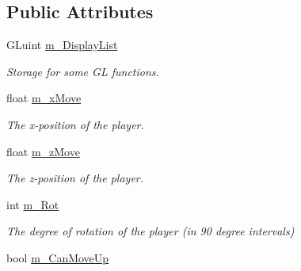 \subsection*{Public Attributes}
\begin{DoxyCompactItemize}
\item 
\hypertarget{classBomberman_afb6735947d5308bfb79026736856cf0a}{G\-Luint \hyperlink{classBomberman_afb6735947d5308bfb79026736856cf0a}{m\-\_\-\-Display\-List}}\label{classBomberman_afb6735947d5308bfb79026736856cf0a}

\begin{DoxyCompactList}\small\item\em Storage for some G\-L functions. \end{DoxyCompactList}\item 
\hypertarget{classBomberman_a59156afbe8c5411468b3c1bf411df69e}{float \hyperlink{classBomberman_a59156afbe8c5411468b3c1bf411df69e}{m\-\_\-x\-Move}}\label{classBomberman_a59156afbe8c5411468b3c1bf411df69e}

\begin{DoxyCompactList}\small\item\em The x-\/position of the player. \end{DoxyCompactList}\item 
\hypertarget{classBomberman_a7e4db42f41e0f48f9e4161b9145d7bab}{float \hyperlink{classBomberman_a7e4db42f41e0f48f9e4161b9145d7bab}{m\-\_\-z\-Move}}\label{classBomberman_a7e4db42f41e0f48f9e4161b9145d7bab}

\begin{DoxyCompactList}\small\item\em The z-\/position of the player. \end{DoxyCompactList}\item 
\hypertarget{classBomberman_a0046791207759f11363b74476ed84233}{int \hyperlink{classBomberman_a0046791207759f11363b74476ed84233}{m\-\_\-\-Rot}}\label{classBomberman_a0046791207759f11363b74476ed84233}

\begin{DoxyCompactList}\small\item\em The degree of rotation of the player (in 90 degree intervals) \end{DoxyCompactList}\item 
\hypertarget{classBomberman_ae5085ae7915b107e3f04bf3910e77bdf}{bool \hyperlink{classBomberman_ae5085ae7915b107e3f04bf3910e77bdf}{m\-\_\-\-Can\-Move\-Up}}\label{classBomberman_ae5085ae7915b107e3f04bf3910e77bdf}


\end{DoxyCompactItemize}
